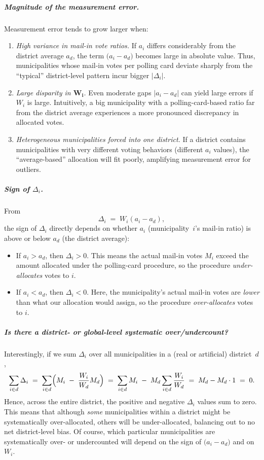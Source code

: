 \documentclass[12pt]{article}
\begin{document}
\subparagraph{Magnitude of the measurement error.}
Measurement error tends to grow larger when:
\begin{enumerate}
  \item \textit{High variance in mail-in vote ratios.} 
  If \(a_i\) differs considerably from the district average \(a_d\), the term \(\bigl(a_i - a_d\bigr)\) becomes large in absolute value. Thus, municipalities whose mail-in votes per polling card deviate sharply from the “typical” district-level pattern incur bigger \(\lvert \Delta_i\rvert\).

  \item \textit{Large disparity in \(\boldsymbol{W_i}\).}
  Even moderate gaps \(\lvert a_i - a_d\rvert\) can yield large errors if \(W_i\) is large. Intuitively, a big municipality with a polling-card-based ratio far from the district average experiences a more pronounced discrepancy in allocated votes.

  \item \textit{Heterogeneous municipalities forced into one district.}
  If a district contains municipalities with very different voting behaviors (different \(a_i\) values), the “average-based” allocation will fit poorly, amplifying measurement error for outliers.
\end{enumerate}

\subparagraph{Sign of \(\Delta_i\).}
From
\[
    \Delta_i \;=\; W_i(a_i - a_d),
\]
the sign of \(\Delta_i\) directly depends on whether \(a_i\) (municipality~\(i\)’s mail-in ratio) is above or below \(a_d\) (the district average):
\begin{itemize}
    \item If \(a_i > a_d\), then \(\Delta_i > 0\). 
    This means the actual mail-in votes \(M_i\) exceed the amount allocated under the polling-card procedure, so the procedure \emph{under-allocates} votes to \(i\).
    \item If \(a_i < a_d\), then \(\Delta_i < 0\). 
    Here, the municipality’s actual mail-in votes are \emph{lower} than what our allocation would assign, so the procedure \emph{over-allocates} votes to \(i\).
\end{itemize}

\subparagraph{Is there a district- or global-level systematic over/undercount?}
Interestingly, if we sum \(\Delta_i\) over all municipalities in a (real or artificial) district~\(d\),
\[
    \sum_{i \in d} \Delta_i
    \;=\;
    \sum_{i \in d} 
    \Bigl(
      M_i
      \;-\;
      \frac{W_i}{W_d} M_d
    \Bigr)
    \;=\;
    \sum_{i \in d} M_i
    \;-\;
    M_d \sum_{i \in d} \frac{W_i}{W_d}
    \;=\;
    M_d - M_d \cdot 1
    \;=\;
    0.
\]
Hence, across the entire district, the positive and negative \(\Delta_i\) values sum to zero. This means that although \emph{some} municipalities within a district might be systematically over-allocated, others will be under-allocated, balancing out to no net district-level bias. Of course, which particular municipalities are systematically over- or undercounted will depend on the sign of \(\bigl(a_i - a_d\bigr)\) and on \(W_i\). 
\end{document}
